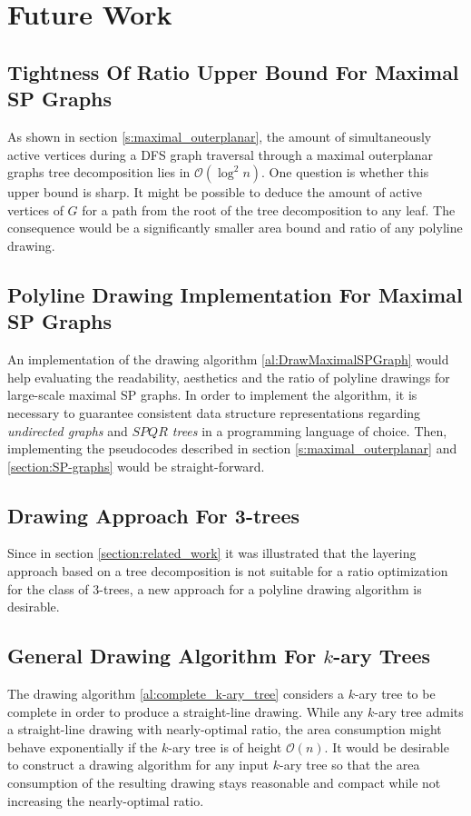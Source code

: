 \section{Future Work}\label{section:future_work}

\subsection*{Tightness Of Ratio Upper Bound For Maximal SP Graphs}

As shown in section \ref{s:maximal_outerplanar}, the amount of simultaneously active vertices during a DFS graph traversal through a maximal outerplanar graphs tree decomposition lies in $\mathcal{O}(\log^2 n)$. One question is whether this upper bound is sharp. It might be possible to deduce the amount of active vertices of $G$ for a path from the root of the tree decomposition to any leaf. The consequence would be a significantly smaller area bound and ratio of any polyline drawing.

\subsection*{Polyline Drawing Implementation For Maximal SP Graphs}

An implementation of the drawing algorithm \ref{al:DrawMaximalSPGraph} would help evaluating the readability, aesthetics and the ratio of polyline drawings for large-scale maximal SP graphs. In order to implement the algorithm, it is necessary to guarantee consistent data structure representations regarding \emph{undirected graphs} and \emph{$SPQR$ trees} in a programming language of choice. Then, implementing the pseudocodes described in section \ref{s:maximal_outerplanar} and \ref{section:SP-graphs} would be straight-forward.

\subsection*{Drawing Approach For 3-trees}

Since in section \ref{section:related_work} it was illustrated that the layering approach based on a tree decomposition is not suitable for a ratio optimization for the class of 3-trees, a new approach for a polyline drawing algorithm is desirable.

\subsection*{General Drawing Algorithm For $k$-ary Trees}

The drawing algorithm \ref{al:complete_k-ary_tree} considers a $k$-ary tree to be complete in order to produce a straight-line drawing. While any $k$-ary tree admits a straight-line drawing with nearly-optimal ratio, the area consumption might behave exponentially if the $k$-ary tree is of height $\mathcal{O}(n)$. It would be desirable to construct a drawing algorithm for any input $k$-ary tree so that the area consumption of the resulting drawing stays reasonable and compact while not increasing the nearly-optimal ratio.